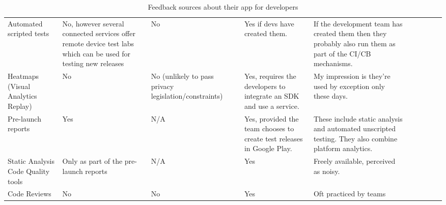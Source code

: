 \begin{table}[H]
\begin{adjustbox}{max width=\textwidth}
\begin{tabular}{p{2.7cm}p{3.12cm}p{3.7cm}p{3.17cm}p{3.17cm}p{2.7cm}p{3.12cm}p{3.7cm}p{3.17cm}p{3.17cm}}
\multicolumn{1}{p{2.7cm}}{\raggedright{\scriptsize Automated scripted tests }} & 
\multicolumn{1}{p{3.12cm}}{\raggedright{\scriptsize No, however several connected services offer remote device test labs which can be used for testing new releases\par}} & 
\multicolumn{1}{p{3.7cm}}{\raggedright{\scriptsize No}} & 
\multicolumn{1}{p{3.17cm}}{\raggedright{\scriptsize Yes if devs have created them.}} & 
\multicolumn{1}{p{3.17cm}}{{\scriptsize If the development team has created them then they probably also run them as part of the CI/CB mechanisms.\par}} \\ 

\multicolumn{1}{p{2.7cm}}{\raggedright{\scriptsize Heatmaps (Visual Analytics Replay)}} & 
\multicolumn{1}{p{3.12cm}}{\raggedright{\scriptsize No}} & 
\multicolumn{1}{p{3.7cm}}{\raggedright{\scriptsize No (unlikely to pass privacy legislation/constraints)}} & 
\multicolumn{1}{p{3.17cm}}{\raggedright{\scriptsize Yes, requires the developers to integrate an SDK and use a service.}} & 
\multicolumn{1}{p{3.17cm}}{\raggedright{\scriptsize My impression is they’re used by exception only these days.}} \\ 

\multicolumn{1}{p{2.7cm}}{\raggedright{\scriptsize Pre-launch reports}} & 
\multicolumn{1}{p{3.12cm}}{\raggedright{\scriptsize Yes}} & 
\multicolumn{1}{p{3.7cm}}{\raggedright{\scriptsize N/A}} & 
\multicolumn{1}{p{3.17cm}}{\raggedright{\scriptsize Yes, provided the team chooses to create test releases in Google Play.}} & 
\multicolumn{1}{p{3.17cm}}{\raggedright{\scriptsize These include static analysis and automated unscripted testing. They also combine platform analytics.\par}} \\ 

\multicolumn{1}{p{2.7cm}}{\raggedright{\scriptsize Static Analysis Code Quality tools}} & 
\multicolumn{1}{p{3.12cm}}{{\scriptsize Only as part of the pre-launch reports}} & 
\multicolumn{1}{p{3.7cm}}{\raggedright{\scriptsize N/A}} & 
\multicolumn{1}{p{3.17cm}}{\raggedright{\scriptsize Yes}} & 
\multicolumn{1}{p{3.17cm}}{\raggedright{\scriptsize Freely available, perceived as noisy.}} \\ 

\multicolumn{1}{p{2.7cm}}{\raggedright{\scriptsize Code Reviews}} & 
\multicolumn{1}{p{3.12cm}}{{\scriptsize No}} & 
\multicolumn{1}{p{3.7cm}}{\raggedright{\scriptsize No}} & 
\multicolumn{1}{p{3.17cm}}{\raggedright{\scriptsize Yes}} & 
\multicolumn{1}{p{3.17cm}}{\raggedright{\scriptsize Oft practiced by teams}} \\ 

\end{tabular}
\end{adjustbox}
\caption{Feedback sources about their app for developers}
\label{tab:feedback-sources-about-their-app-for-devs}
\end{table}
\vspace{2\baselineskip}


